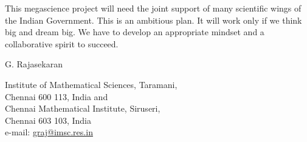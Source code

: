 This megascience project will need the joint support of
many scientific wings of the Indian Government. This is
an ambitious plan. It will work only if we think big and
dream big. We have to develop an appropriate mindset
and a collaborative spirit to succeed.
\begin{flushright}
{G. Rajasekaran}
\end{flushright}
Institute of Mathematical Sciences, Taramani,\\
Chennai 600 113, India and\\
Chennai Mathematical Institute, Siruseri,\\
Chennai 603 103, India\\
e-mail: \url{graj@imsc.res.in}
